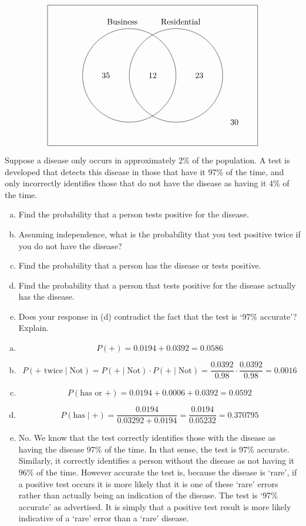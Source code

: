 \documentclass[11pt,letterpaper]{article}
\begin{document}
	\[
	\begin{tikzpicture}
	\draw (0,0) rectangle (9,6);
	\draw (3.5,3) circle (2);
	\draw (5.5,3) circle (2);
	
	\node at (3.2,5.3) {Business};
	\node at (5.7,5.3) {Residential}; 
	
	\node at (2.5,3) {35};
	\node at (4.5,3) {12};
	\node at (6.5,3) {23};
	\node at (8,1) {30};
	\end{tikzpicture}
	\]



\newpage



 Suppose a disease only occurs in approximately 2\% of the population. A test is developed that detects this disease in those that have it 97\% of the time, and only incorrectly identifies those that do not have the disease as having it 4\% of the time. 
	\begin{enumerate}[(a)]
	\item Find the probability that a person tests positive for the disease. 
	\item Assuming independence, what is the probability that you test positive twice if you do not have the disease?
	\item Find the probability that a person has the disease or tests positive. 
	\item Find the probability that a person that tests positive for the disease actually has the disease. 
	\item Does your response in (d) contradict the fact that the test is `97\% accurate'? Explain. 
	\end{enumerate} \pspace

\sol 
\begin{enumerate}[(a)]
\item 
	\[
	P(\text{+})= 0.0194 + 0.0392= 0.0586
	\]

\item 
	\[
	P(\text{+ twice} \;|\; \text{Not})= P(\text{+} \;|\; \text{Not}) \cdot P(\text{+} \;|\; \text{Not})= \dfrac{0.0392}{0.98} \cdot \dfrac{0.0392}{0.98}= 0.0016
	\]

\item 
	\[
	P(\text{has or +})= 0.0194 + 0.0006 + 0.0392= 0.0592
	\]

\item 
	\[
	P(\text{has} \;|\; \text{+})= \dfrac{0.0194}{0.03292 + 0.0194}= \dfrac{0.0194}{0.05232}= 0.370795
	\]

\item No. We know that the test correctly identifies those with the disease as having the disease 97\% of the time. In that sense, the test is 97\% accurate. Similarly, it correctly identifies a person without the disease as not having it 96\% of the time. However accurate the test is, because the disease is `rare', if a positive test occurs it is more likely that it is one of these `rare' errors rather than actually being an indication of the disease. The test is `97\% accurate' as advertised. It is simply that a positive test result is more likely indicative of a `rare' error than a `rare' disease. 
\end{enumerate} \vfill
\end{document}
